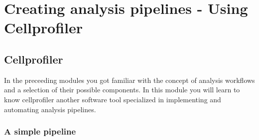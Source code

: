 \chapter{Creating analysis pipelines - Using Cellprofiler}
\section{Cellprofiler}
In the preceeding modules you got familiar with the concept of
analysis workflows and a selection of their possible components. In
this module you will learn to know cellprofiler another software tool
specialized in implementing and automating analysis pipelines.

\subsection{A simple pipeline}

